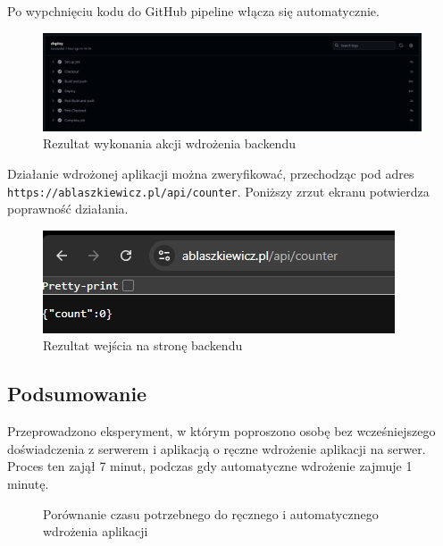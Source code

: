 \documentclass{article}
\begin{document}
Po wypchnięciu kodu do GitHub pipeline włącza się automatycznie.

\begin{figure}[H]
    \centering
    \includegraphics[width=1\linewidth]{pierwszaAkcjaBackendu.png}
    \caption{Rezultat wykonania akcji wdrożenia backendu}
    \label{fig:enter-label}
\end{figure}

Działanie wdrożonej aplikacji można zweryfikować, przechodząc pod adres \lstinline|https://ablaszkiewicz.pl/api/counter|. Poniższy zrzut ekranu potwierdza poprawność działania.

\begin{figure}[H]
    \centering
    \includegraphics[width=1\linewidth]{rezultatPierwszejWizytyPodBackend.png}
    \caption{Rezultat wejścia na stronę backendu}
    \label{fig:enter-label}
\end{figure}

\subsection{Podsumowanie}

Przeprowadzono eksperyment, w którym poproszono osobę bez wcześniejszego doświadczenia z serwerem i aplikacją o ręczne wdrożenie aplikacji na serwer. Proces ten zajął 7 minut, podczas gdy automatyczne wdrożenie zajmuje 1 minutę.

\begin{figure}[H]
\centering
{}
\caption{Porównanie czasu potrzebnego do ręcznego i automatycznego wdrożenia aplikacji}
\label{fig:czas_wdrozenia}
\end{figure}
\end{document}

